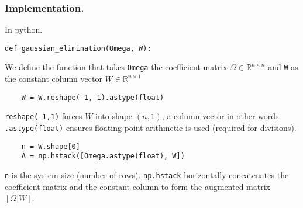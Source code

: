 \documentclass[../../../main.tex]{subfiles}
\begin{document}
\subsubsection{Implementation.}
In python.
\begin{verbatim}
def gaussian_elimination(Omega, W):
\end{verbatim}
We define the function that takes \verb|Omega| the coefficient matrix $\Omega \in \mathbb{R}^{n \times n}$ and \verb|W| as the constant column vector $W \in \mathbb{R}^{n \times 1}$
\begin{verbatim}
    W = W.reshape(-1, 1).astype(float)
\end{verbatim}
\verb|reshape(-1,1)| forces $W$ into shape $(n,1)$,  a column vector in other words.
\verb|.astype(float)| ensures floating-point arithmetic is used (required for divisions).
\begin{verbatim}
    n = W.shape[0]
    A = np.hstack([Omega.astype(float), W]) 
\end{verbatim}
\verb|n| is the system size (number of rows).
\verb|np.hstack| horizontally concatenates the coefficient matrix and the constant column to form the augmented matrix $[\Omega|W]$.
\end{document}
